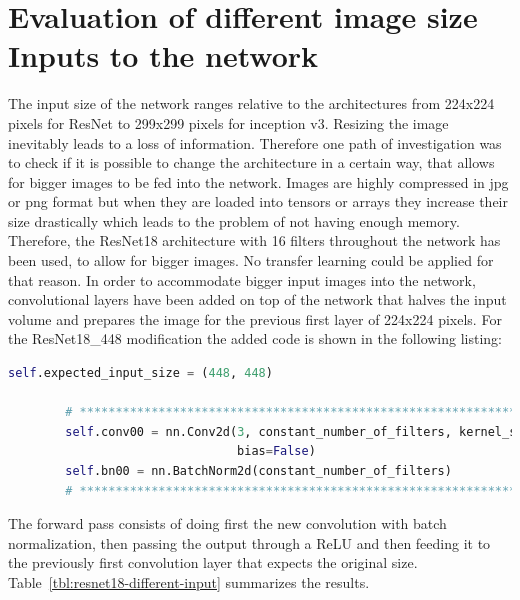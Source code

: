 \section{Evaluation of different image size Inputs to the network}

The input size of the network ranges relative to the architectures from 224x224 pixels for ResNet to 299x299 pixels for inception v3. Resizing the image inevitably leads to a loss of information. Therefore one path of investigation was to check if it is possible to change the architecture in a certain way, that allows for bigger images to be fed into the network. Images are highly compressed in jpg or png format but when they are loaded into tensors or arrays they increase their size drastically which leads to the problem of not having enough memory. Therefore, the ResNet18 architecture with 16 filters throughout the network has been used, to allow for bigger images. No transfer learning could be applied for that reason. In order to accommodate bigger input images into the network, convolutional layers have been added on top of the network that halves the input volume and prepares the image for the previous first layer of 224x224 pixels. For the ResNet18\_448 modification the added code is shown in the following listing:


\begin{minipage}{\linewidth}
\begin{lstlisting}[language=Python, caption=Python example, basicstyle=\tiny]
        self.expected_input_size = (448, 448)

        # ************************************************************************************************
        self.conv00 = nn.Conv2d(3, constant_number_of_filters, kernel_size=7, stride=2, padding=3,
                                bias=False)
        self.bn00 = nn.BatchNorm2d(constant_number_of_filters)
        # ************************************************************************************************
\end{lstlisting}
\end{minipage}

The forward pass consists of doing first the new convolution with batch normalization, then passing the output through a ReLU and then feeding it to the previously first convolution layer that expects the original size. Table~\ref{tbl:resnet18-different-input} summarizes the results.

